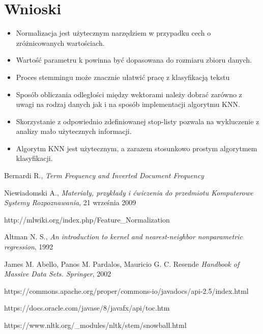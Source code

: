 \documentclass{classrep}
\begin{document}
\section{Wnioski}
\begin{itemize}
	\item Normalizacja jest użytecznym narzędziem w przypadku cech o zróżnicowanych wartościach.
	\item Wartość parametru k powinna być dopasowana do rozmiaru zbioru danych.

	\item Proces stemmingu może znacznie ułatwić pracę z klasyfikacją tekstu
	\item Sposób obliczania odległości między wektorami należy dobrać zarówno z uwagi na rodzaj danych jak i na sposób implementacji algorytmu KNN.
	\item Skorzystanie z odpowiednio zdefiniowanej stop-listy pozwala na wykluczenie z analizy mało użytecznych informacji.
	\item Algorytm KNN jest użytecznym, a zarazem stosunkowo prostym algorytmem klasyfikacji.
\end{itemize}

\begin{thebibliography}{0}
Bernardi R., \textit{Term Frequency and Inverted Document Frequency}

Niewiadomski A., \textit{Materiały, przykłady i ćwiczenia do przedmiotu Komputerowe Systemy Rozpoznawania}, 21 września 2009 

http://mlwiki.org/index.php/Feature\_Normalization

Altman N. S., \textit{An introduction to kernel and nearest-neighbor nonparametric regression}, 1992

James M. Abello, Panos M. Pardalos, Mauricio G. C. Resende \textit{Handbook of Massive Data Sets. Springer}, 2002

https://commons.apache.org/proper/commons-io/javadocs/api-2.5/index.html

https://docs.oracle.com/javase/8/javafx/api/toc.htm

https://www.nltk.org/\_modules/nltk/stem/snowball.html

\end{thebibliography}
\end{document}
